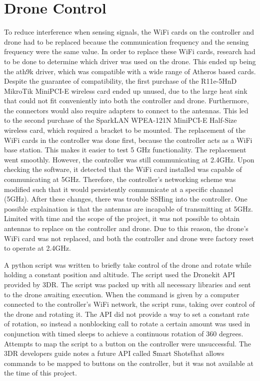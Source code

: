 \section{Drone Control}
To reduce interference when sensing signals, the WiFi cards on the controller and drone had to be replaced because the communication frequency and the sensing frequency were the same value. In order to replace these WiFi cards, research had to be done to determine which driver was used on the drone. This ended up being the ath9k driver, which was compatible with a wide range of Atheros based cards. Despite the guarantee of compatibility, the first purchase of the R11e-5HnD MikroTik MiniPCI-E wireless card ended up unused, due to the large heat sink that could not fit conveniently into both the controller and drone. Furthermore, the connectors would also require adapters to connect to the antennas. This led to the second purchase of the SparkLAN WPEA-121N MiniPCI-E Half-Size wireless card, which required a bracket to be mounted. The replacement of the WiFi cards in the controller was done first, because the controller acts as a WiFi base station. This makes it easier to test 5 GHz functionality. The replacement went smoothly. However, the controller was still communicating at 2.4GHz. Upon checking the software, it detected that the WiFi card installed was capable of communicating at 5GHz. Therefore, the controller's networking scheme was modified such that it would persistently communicate at a specific channel (5GHz). After these changes, there was trouble SSHing into the controller. One possible explaination is that the antennas are incapable of transmitting at 5GHz. Limited with time and the scope of the project, it was not possible to obtain antennas to replace on the controller and drone. Due to this reason, the drone's WiFi card was not replaced, and both the controller and drone were factory reset to operate at 2.4GHz. \par

A python script was written to briefly take control of the drone and rotate while holding a constant position and altitude. The script used the Dronekit API provided by 3DR. The script was packed up with all necessary libraries and sent to the drone awaiting execution. When the command is given by a computer connected to the controller's WiFi network, the script runs, taking over control of the drone and rotating it. The API did not provide a way to set a constant rate of rotation, so instead a nonblocking call to rotate a certain amount was used in conjunction with timed sleeps to achieve a continuous rotation of 360 degrees. Attempts to map the script to a button on the controller were unsuccessful. The 3DR developers guide notes a future API called \"Smart Shots\" that allows commands to be mapped to buttons on the controller, but it was not available at the time of this project.

